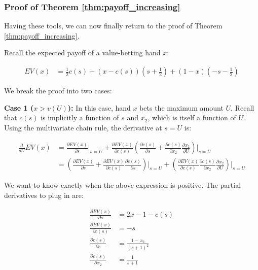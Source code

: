 \documentclass[../../main/main.tex]{subfiles}
\begin{document}
\subsubsection{Proof of Theorem \ref{thm:payoff_increasing}}

Having these tools, we can now finally return to the proof of Theorem \ref{thm:payoff_increasing}.

\begin{customproof}
    Recall the expected payoff of a value-betting hand $x$:

    \begin{align*}
        EV(x) & = \frac{1}{2} c(s) + (x - c(s)) \left(s+\frac{1}{2}\right) + (1-x) \left(-s-\frac{1}{2}\right)
    \end{align*}

    We break the proof into two cases:

    \textbf{Case 1 ($x > v(U)$):} In this case, hand $x$ bets the maximum amount $U$. Recall that $c(s)$ is implicitly a function of $s$ and $x_2$, which is itself a function of $U$. Using the multivariate chain rule, the derivative at $s=U$ is:

    \begin{align*}
        \frac{d}{dU} EV(x) & = \frac{\partial EV(x)}{\partial s} \bigg|_{s=U} + \frac{\partial EV(x)}{\partial c(s)} \left( \frac{\partial c(s)}{\partial s} + \frac{\partial c(s)}{\partial x_2} \frac{\partial x_2}{\partial U} \right) \bigg|_{s=U} \\
        & = \left( \frac{\partial EV(x)}{\partial s} + \frac{\partial EV(x)}{\partial c(s)} \frac{\partial c(s)}{\partial s}\right)\bigg|_{s=U}   +  \left( \frac{\partial EV(x)}{\partial c(s)} \frac{\partial c(s)}{\partial x_2} \frac{\partial x_2}{\partial U} \right) \bigg|_{s=U}
    \end{align*}

    We want to know exactly when the above expression is positive. The partial derivatives to plug in are:

    \begin{align*}
        \frac{\partial EV(x)}{\partial s} & = 2x - 1 - c(s) \\
        \frac{\partial EV(x)}{\partial c(s)} & = - s \\
        \frac{\partial c(s)}{\partial s} & = \frac{1-x_2}{(s+1)^2} \\
        \frac{\partial c(s)}{\partial x_2} & = \frac{1}{s+1} \\
    \end{align*}


\end{customproof}
\end{document}
